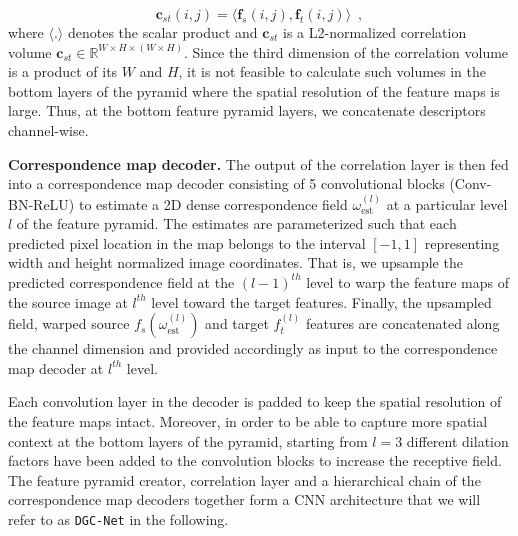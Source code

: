 \documentclass[10pt,twocolumn,letterpaper]{article}
\begin{document}
\begin{equation}\label{eq:eq_corr}
    \mathbf{c}_{st}\left(i,j\right) = \langle \mathbf{f}_{s}\left(i,j\right), \mathbf{f}_{t}\left(i,j\right)\rangle \enspace ,
\end{equation}
\noindent where $\langle.\rangle$ denotes the scalar product and $\mathbf{c}_{st}$ is a L2-normalized correlation volume $\mathbf{c}_{st} \in \mathbb{R}^{W \times H \times \left(W \times H \right)}$. Since the third dimension of the correlation volume is a product of its $W$ and $H$, it is not feasible to calculate such volumes in the bottom layers of the pyramid where the spatial resolution of the feature maps is large. Thus, at the bottom feature pyramid layers, we concatenate descriptors channel-wise.

\noindent\textbf{Correspondence map decoder.} 
The output of the correlation layer is then fed into a correspondence map decoder consisting of 5 convolutional blocks (Conv-BN-ReLU) to estimate a 2D dense correspondence field $\omega_{\text{est}}^{\left(l\right)}$ at a particular level $l$ of the feature pyramid. The estimates are parameterized such that each predicted pixel location in the map belongs to the interval $\left[-1,1\right]$ representing width and height normalized image coordinates. That is, we upsample the predicted correspondence field at the $\left(l-1\right)^{th}$ level to warp the feature maps of the source image at $l^{th}$ level toward the target features. Finally, the upsampled field, warped source $f_s(\omega_{\text{est}}^{\left(l\right)})$ and target $f_t^{\left(l\right)}$ features are concatenated along the channel dimension and provided accordingly as input to the correspondence map decoder at $l^{th}$ level. 

Each convolution layer in the decoder is padded to keep the spatial resolution of the feature maps intact. Moreover, in order to be able to capture more spatial context at the bottom layers of the pyramid, starting from $l=3$ different dilation factors have been added to the convolution blocks to increase the receptive field. The feature pyramid creator, correlation layer and a hierarchical chain of the correspondence map decoders together form a CNN architecture that we will refer to as \texttt{DGC-Net} in the following.
\end{document}
